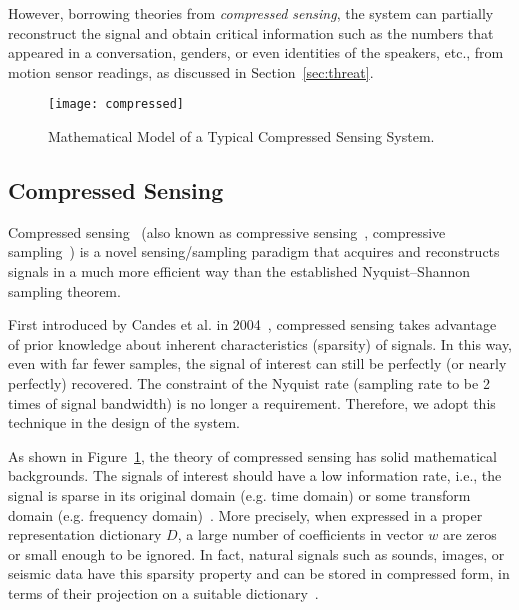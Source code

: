 %
However, borrowing theories from \textit{compressed sensing}, the {\systemName} system can partially reconstruct the signal and obtain critical information such as the numbers that appeared in a conversation, genders, or even identities of the speakers, etc., from motion sensor readings, as discussed in Section~\ref{sec:threat}.




\begin{figure}[!h]
	\centering
	\texttt{[image: compressed]}
	\caption{Mathematical Model of a Typical Compressed Sensing System. }
	\label{fig:compressed}
\end{figure}

\subsection{Compressed Sensing}\label{sec:compressed}

Compressed sensing~\cite{donoho2006compressed} (also known as compressive sensing~\cite{siddamal2015survey}, compressive sampling~\cite{candes2006compressive}) is a novel sensing/sampling paradigm that acquires and reconstructs signals in a much more efficient way than the established Nyquist–Shannon sampling theorem. 


First introduced by Candes et al. in 2004~\cite{candes2004robust}, compressed sensing takes advantage of prior knowledge about inherent characteristics (sparsity) of signals.
In this way, even with far fewer samples, the signal of interest can still be perfectly (or nearly perfectly) recovered. The constraint of the Nyquist rate (sampling rate to be 2 times of signal bandwidth) is no longer a requirement. Therefore, we adopt this technique in the design of the  {\systemName} system.


As shown in Figure~\ref{fig:compressed}, the theory of compressed sensing has solid mathematical backgrounds. 
%
The signals of interest should have a low information rate, i.e., the signal is sparse in its original domain (e.g. time domain) or some transform domain (e.g. frequency domain)~\cite{candes2008introduction}. More precisely, when expressed in a proper representation dictionary $D$, a large number of coefficients in vector $w$ are zeros or small enough to be ignored. In fact, natural signals such as sounds, images,  or seismic data have this sparsity property and can be stored in compressed form, in terms of their projection on a suitable dictionary~\cite{qaisar2013compressive}. 



